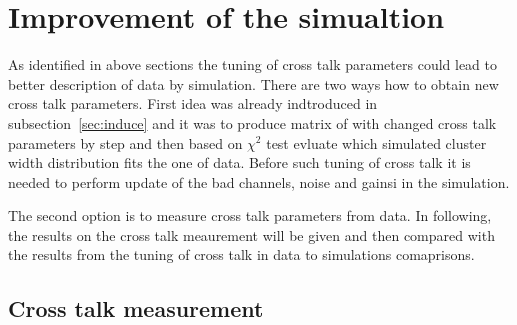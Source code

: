 
\newpage

\section{Improvement of the simualtion}

As identified in above sections the tuning of cross talk parameters could lead to better description of data by simulation. There are two ways how to obtain new cross talk parameters. First idea was already indtroduced in subsection~\ref{sec:induce} and it was to produce matrix of with changed cross talk parameters by step and then based on $\chi^{2}$ test evluate which simulated cluster width distribution fits the one of data. Before such tuning of cross talk it is needed to perform update of the bad channels, noise and gainsi in the simulation.

The second option is to measure cross talk parameters from data. In following, the results on the cross talk meaurement will be given and then compared with the results from the tuning of cross talk in data to simulations comaprisons.



\subsection{Cross talk  measurement~\label{sec:xtalk}}


